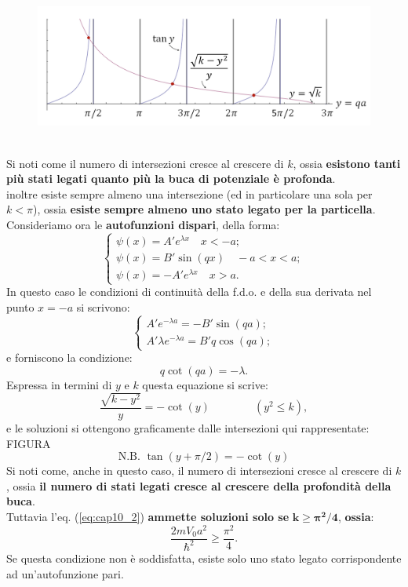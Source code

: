 \documentclass[a4paper,12pt,twoside]{book}
\begin{document}
\begin{figure}[!htbp]
\includegraphics[width=\textwidth]{immagini/cap_10/fig_10_3.png}
\end{figure}
\\
Si noti come il numero di intersezioni cresce al crescere di $k$, ossia \textbf{esistono tanti più stati legati quanto più la buca di potenziale è profonda}.\\
inoltre esiste sempre almeno una intersezione (ed in particolare una sola per $k<\pi$), ossia \textbf{esiste sempre almeno uno stato legato per la particella}.\\
Consideriamo ora le \textbf{autofunzioni dispari}, della forma:
\begin{equation}
\begin{cases}
\psi (x) = A'e^{\lambda x} \quad x<-a;\\
\psi (x) = B'\sin(qx) \quad -a<x<a;\\
\psi (x) = -A'e^{\lambda x} \quad x>a.\end{cases} 
\end{equation}
In questo caso le condizioni di continuità della f.d.o. e della sua derivata nel punto $x=-a$ si scrivono:
\begin{equation}
\begin{cases}
A'e^{-\lambda a} =-B'\sin(qa) ;\\
A' \lambda e^{-\lambda a} = B'q \cos (qa);\end{cases} 
\end{equation}
e forniscono la condizione:
\begin{equation}
q \cot (qa) =- \lambda.
\label{eq:cap10_2}
\end{equation}
Espressa in termini di $y$ e $k$ questa equazione si scrive:
\begin{equation}
\frac{\sqrt{k-y^2}}{y}= -\cot (y) \qquad \qquad (y^2 \leq k),
\end{equation}
e le soluzioni si ottengono graficamente dalle intersezioni qui rappresentate:\\
FIGURA\\
\[ \textrm{N.B. } \tan (y+\pi/2) = -\cot (y) \]
Si noti come, anche in questo caso, il numero di intersezioni cresce al crescere di $k$, ossia \textbf{il numero di stati legati cresce al crescere della profondità della buca}.\\
Tuttavia l'eq. (\ref{eq:cap10_2}) \textbf{ammette soluzioni solo se} $\mathbf{k\geq \pi^2/4}$,\textbf{ ossia}:
\begin{equation}
\frac{2mV_0 a^2}{\hbar ^2} \geq \frac{\pi ^2}{4}.
\end{equation}
Se questa condizione non è soddisfatta, esiste solo uno stato legato corrispondente ad un'autofunzione pari.
\end{document}
